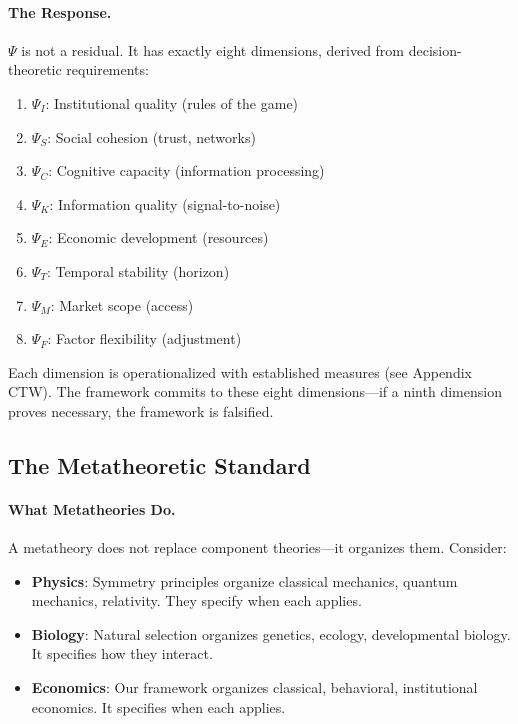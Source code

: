 \paragraph{The Response.}
$\Psi$ is not a residual. It has exactly eight dimensions, derived from decision-theoretic requirements:

\begin{enumerate}
    \item $\Psi_I$: Institutional quality (rules of the game)
    \item $\Psi_S$: Social cohesion (trust, networks)
    \item $\Psi_C$: Cognitive capacity (information processing)
    \item $\Psi_K$: Information quality (signal-to-noise)
    \item $\Psi_E$: Economic development (resources)
    \item $\Psi_T$: Temporal stability (horizon)
    \item $\Psi_M$: Market scope (access)
    \item $\Psi_F$: Factor flexibility (adjustment)
\end{enumerate}

Each dimension is operationalized with established measures (see Appendix CTW). The framework commits to these eight dimensions---if a ninth dimension proves necessary, the framework is falsified.

\subsection{The Metatheoretic Standard}

\paragraph{What Metatheories Do.}
A metatheory does not replace component theories---it organizes them. Consider:

\begin{itemize}
    \item \textbf{Physics}: Symmetry principles organize classical mechanics, quantum mechanics, relativity. They specify when each applies.
    \item \textbf{Biology}: Natural selection organizes genetics, ecology, developmental biology. It specifies how they interact.
    \item \textbf{Economics}: Our framework organizes classical, behavioral, institutional economics. It specifies when each applies.
\end{itemize}

